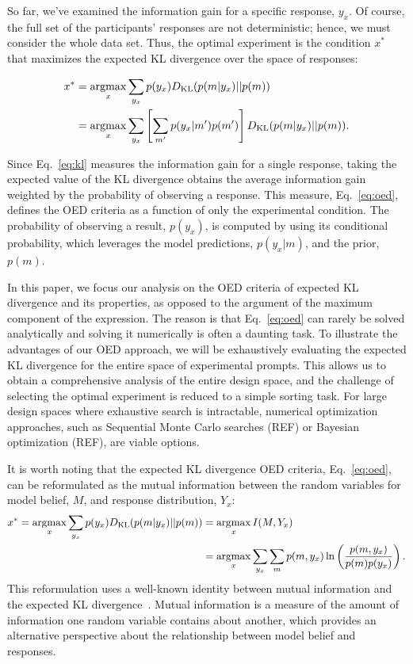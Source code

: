 \documentclass{article}
\newcommand{\argmax}{\operatornamewithlimits{argmax}}
\begin{document}
So far, we've examined the information gain for a specific response, $y_x$.
Of course, the full set of the participants' responses are not deterministic; hence, we must consider the whole data set. 
Thus, the optimal experiment is the condition $x^*$ that maximizes the expected KL divergence over the space of responses:

\begin{align}
x^{*} &= \argmax_{x} \sum\limits_{y_x} p(y_x) D_{\text{KL}}(p(m|y_x) || p(m)) \notag \\
    &= \argmax_{x} \sum\limits_{y_x} \left[\sum\limits_{m'} p(y_x|m')p(m')\right] D_{\text{KL}}(p(m|y_x) || p(m)). \label{eq:oed}
\end{align}

Since Eq.~\ref{eq:kl} measures the information gain for a single response, taking the expected value of the KL divergence obtains the average information gain weighted by the probability of observing a response. This measure, Eq.~\ref{eq:oed}, defines the OED criteria as a function of only the experimental condition. The probability of observing a result, $p(y_x)$, is computed by using its conditional probability, which leverages the model predictions, $p(y_x|m)$, and the prior, $p(m)$.

In this paper, we focus our analysis on the OED criteria of expected KL divergence and its properties, as opposed to the argument of the maximum component of the expression. The reason is that Eq.~\ref{eq:oed} can rarely be solved analytically and solving it numerically is often a daunting task. To illustrate the advantages of our OED approach, we will be exhaustively evaluating the expected KL divergence for the entire  space of experimental prompts. This allows us to obtain a comprehensive analysis of the entire design space, and the challenge of selecting the optimal experiment is reduced to a simple sorting task. For large design spaces where exhaustive search is intractable, numerical optimization approaches, such as Sequential Monte Carlo searches (REF) or Bayesian optimization (REF), are viable options. 

It is worth noting that the expected KL divergence OED criteria, Eq.~\ref{eq:oed}, can be reformulated as the mutual information between the random variables for model belief, $M$, and response distribution, $Y_x$:
\begin{align}
x^* = \argmax_{x} \sum\limits_{y_x} p(y_x) D_{\text{KL}}(p(m|y_x) || p(m)) &= \argmax_{x} I(M, Y_x) \notag \\
    &= \argmax_{x} \sum\limits_{y_x} \sum\limits_{m} p(m, y_x) \ln \left( \frac{p(m, y_x)}{p(m)p(y_x)}\right). \label{eq:mi}
\end{align}
This reformulation uses a well-known identity between mutual information and the expected KL divergence~\cite{cover91:eit}. Mutual information is a measure of the amount of information one random variable contains about another, which provides an alternative perspective about the relationship between model belief and responses. 
\end{document}
